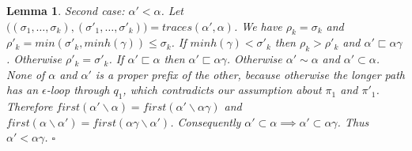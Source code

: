 \documentclass[AMA,STIX1COL]{WileyNJD-v2}
\newtheorem{XLem}{Lemma}
\begin{document}
\begin{XLem}
    Second case: $\alpha' < \alpha$.
    Let $\big( (\sigma_1, \hdots, \sigma_k), (\sigma'_1, \hdots, \sigma'_k) \big) = traces (\alpha', \alpha)$.
    We have $\rho_k = \sigma_k$ and $\rho'_k = min (\sigma'_k, minh(\gamma)) \leq \sigma_k$.
    If $minh(\gamma) < \sigma'_k$ then $\rho_k > \rho'_k$ and $\alpha' \sqsubset \alpha \gamma$.
    Otherwise $\rho'_k = \sigma'_k$.
    If $\alpha' \sqsubset \alpha$ then $\alpha' \sqsubset \alpha \gamma$.
    Otherwise $\alpha' \sim \alpha$ and $\alpha' \subset \alpha$.
    None of $\alpha$ and $\alpha'$ is a proper prefix of the other,
    because otherwise the longer path has an $\epsilon$-loop through $q_1$, which contradicts our assumption about $\pi_1$ and $\pi'_1$.
    Therefore $first (\alpha' \backslash \alpha) = first (\alpha' \backslash \alpha \gamma)$
    and $first (\alpha \backslash \alpha') = first (\alpha \gamma \backslash \alpha')$.
    Consequently $\alpha' \subset \alpha \implies \alpha' \subset \alpha \gamma$.
    Thus $\alpha' < \alpha \gamma$.
    $\square$
    \end{XLem}
\end{document}
